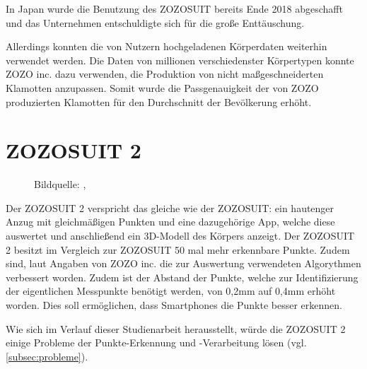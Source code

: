 In Japan wurde die Benutzung des ZOZOSUIT bereits Ende 2018 abgeschafft und das Unternehmen entschuldigte sich für die große Enttäuschung.

Allerdings konnten die von Nutzern hochgeladenen Körperdaten weiterhin verwendet werden. Die Daten von millionen verschiedenster Körpertypen 
konnte ZOZO inc. dazu verwenden, die Produktion von nicht maßgeschneiderten Klamotten anzupassen. Somit wurde die Passgenauigkeit der von ZOZO 
produzierten Klamotten für den Durchschnitt der Bevölkerung erhöht.

\section{ZOZOSUIT 2}
\label{sec:zozosuit2}

\begin{figure}[H]
    \centering 
    \qquad
    \caption{Bildquelle: \cite{misc:zozopictwo}, \cite{misc:zozopictwopoints}} 
    \label{img:zozotwo}
  \end{figure}

Der ZOZOSUIT 2 verspricht das gleiche wie der ZOZOSUIT: ein hautenger Anzug mit gleichmäßigen Punkten 
und eine dazugehörige App, welche diese auswertet und anschließend ein 3D-Modell des Körpers anzeigt. \newline
Der ZOZOSUIT 2 besitzt im Vergleich zur ZOZOSUIT 50 mal mehr erkennbare Punkte. Zudem sind, laut Angaben von ZOZO inc. 
die zur Auswertung verwendeten Algorythmen verbessert worden. Zudem ist der Abstand der Punkte, welche zur Identifizierung 
der eigentlichen Messpunkte benötigt werden, von 0,2mm auf 0,4mm erhöht worden. Dies soll ermöglichen, dass Smartphones die 
Punkte besser erkennen. \cite{misc:zozotwo}

Wie sich im Verlauf dieser Studienarbeit herausstellt, würde die ZOZOSUIT 2 einige Probleme der Punkte-Erkennung und -Verarbeitung lösen (vgl. \ref{subsec:probleme}).